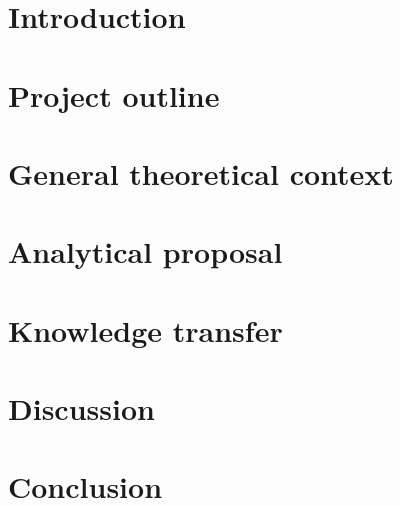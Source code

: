 \documentclass[12pt]{article}
\begin{document}
\vspace{2cm}
\listoffigures
\vspace{2cm}
\listoftables

\newpage


    
\section{Introduction}
\label{intro}


\section{Project outline}
\label{project}


\section{General theoretical context}
\label{theory}


\section{Analytical proposal}
\label{analysis}


\section{Knowledge transfer}
\label{teaching}


\section{Discussion}
\label{discussion}


\section{Conclusion}
\label{conclusion}


\newpage

    
\end{document}
